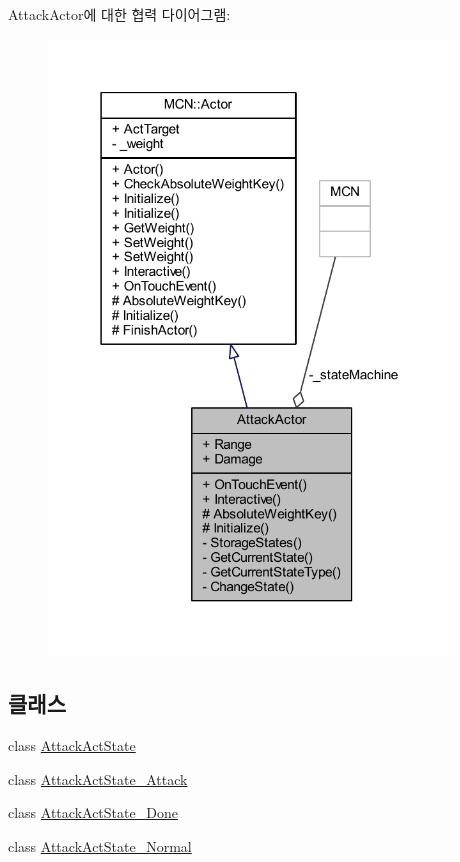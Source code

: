 Attack\+Actor에 대한 협력 다이어그램\+:
\nopagebreak
\begin{figure}[H]
\begin{center}
\leavevmode
\includegraphics[width=303pt]{class_attack_actor__coll__graph}
\end{center}
\end{figure}
\subsection*{클래스}
\begin{DoxyCompactItemize}
\item 
class \hyperlink{class_attack_actor_1_1_attack_act_state}{Attack\+Act\+State}
\item 
class \hyperlink{class_attack_actor_1_1_attack_act_state___attack}{Attack\+Act\+State\+\_\+\+Attack}
\item 
class \hyperlink{class_attack_actor_1_1_attack_act_state___done}{Attack\+Act\+State\+\_\+\+Done}
\item 
class \hyperlink{class_attack_actor_1_1_attack_act_state___normal}{Attack\+Act\+State\+\_\+\+Normal}
\end{DoxyCompactItemize}
